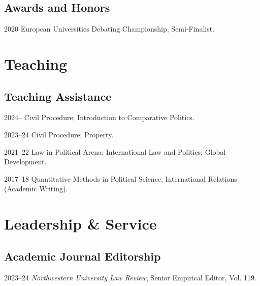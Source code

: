 \documentclass[11pt,letterpaper]{report}
\begin{document}
    \subsection*{Awards and Honors}

    \begin{tablist}

        \item[2020] \tab{}European Universities Debating Championship, Semi-Finalist. 
    \end{tablist}

    \section*{Teaching}

    \subsection*{Teaching Assistance}

    \begin{tablist}
        

        
        \item[2024--]      \tab{}Civil Procedure; Introduction to Comparative Politics.
        \item[2023--24]    \tab{}Civil Procedure; Property.
        \item[2021--22]    \tab{}Law in Political Arena; International Law and Politics; Global Development.
        \item[2017--18]    \tab{}Quantitative Methods in Political Science; International Relations (Academic Writing).

    \end{tablist}



    \section*{Leadership \& Service}



    \subsection*{Academic Journal Editorship}

    \begin{tablist}

        \item[2023--24]  \tab{}\textit{Northwestern University Law Review}, Senior Empirical Editor, Vol. 119. 


    \end{tablist}
\end{document}
